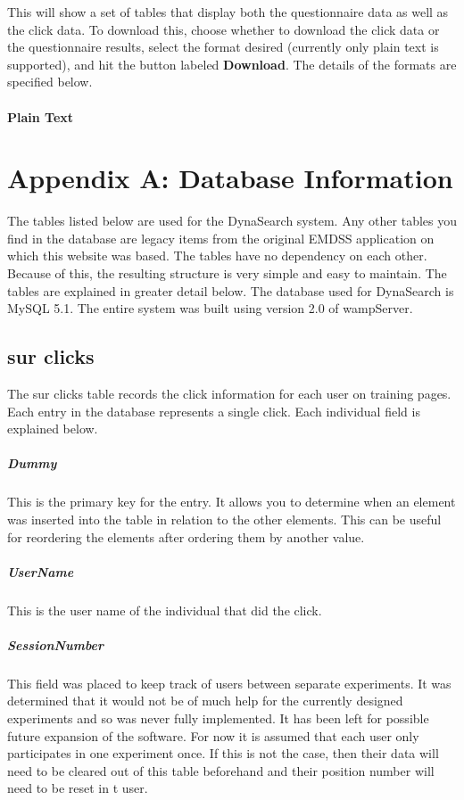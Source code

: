 \documentclass[article]{ij4uq}              %
\begin{document}
This will show a set of tables that display both the questionnaire data as well as the click data.  To download this, choose whether to download the click data or the questionnaire results, select the format desired (currently only plain text is supported), and hit the button labeled \textbf{Download}.  The details of the formats are specified below.

\paragraph{Plain Text}


\section{Appendix A: Database Information}
The tables listed below are used for the DynaSearch system. Any other tables you find in the database are legacy items from the original EMDSS application on which this website was based. The tables have no dependency on each other. Because of this, the resulting structure is very simple and easy to maintain. The tables are explained in greater detail below. The database used for DynaSearch is MySQL 5.1. The entire system was built using version 2.0 of wampServer.

\subsection{sur clicks}
The sur clicks table records the click information for each user on training pages. Each entry in the database represents a single click. Each individual field is explained below. 

\subparagraph{Dummy}
This is the primary key for the entry. It allows you to determine when an element was inserted into the table in relation to the other elements. This can be useful for reordering the elements after ordering them by another value.

\subparagraph{UserName}
This is the user name of the individual that did the click.

\subparagraph{SessionNumber}
This field was placed to keep track of users between separate experiments. It was determined that it would not be of much help for the currently designed experiments and so was never fully implemented. It has been left for possible future expansion of the software. For now it is assumed that each user only participates in one experiment once. If this is not the case, then their data will need to be cleared out of this table beforehand and their position number will need to be reset in t user.
\end{document}

